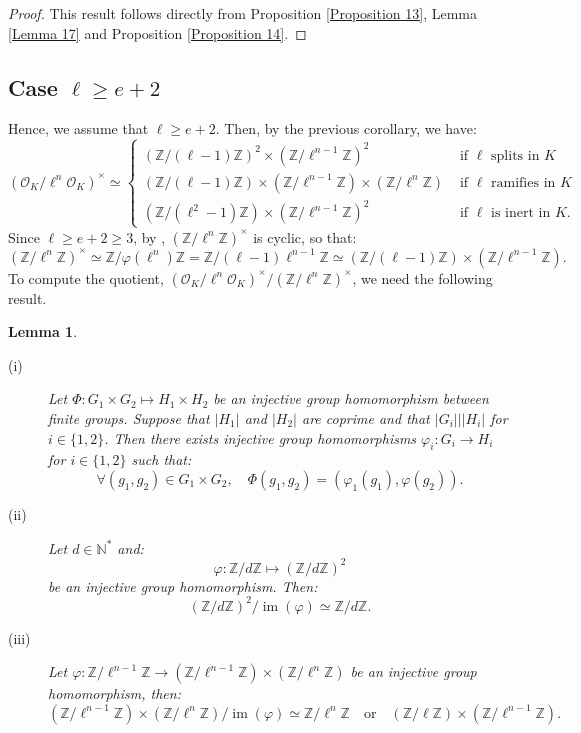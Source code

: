 \documentclass[a4paper,10pt]{report}
\theoremstyle{definition}
\theoremstyle{plain}
\newtheorem{Lemma}[Definition]{Lemma}
\theoremstyle{definition}
\newcommand{\N}{\mathbb{N}}
\newcommand{\Z}{\mathbb{Z}}
\newcommand{\mO}{\mathcal{O}}
\DeclareMathOperator{\im}{im}
\renewcommand{\(}{\left(}
\renewcommand{\)}{\right)}
\begin{document}
\begin{proof}
This result follows directly from Proposition \ref{Proposition 13}, Lemma \ref{Lemma 17} and Proposition \ref{Proposition 14}.
\end{proof}

\subsection{Case $\ell\geq e+2$}

Hence, we assume that $\ell\geq e+2$. Then, by the previous corollary, we have:
\[(\mO_K/\ell^n\mO_K)^\times\simeq \left\{ \begin{array}{ll} 
(\Z/(\ell-1)\Z)^2\times(\Z/\ell^{n-1}\Z)^2 & \mbox{ if $\ell$ splits in $K$}\\
(\Z/(\ell-1)\Z)\times(\Z/\ell^{n-1}\Z)\times(\Z/\ell^{n}\Z)  & \mbox{ if $\ell$ ramifies in $K$}\\ 
(\Z/(\ell^2-1)\Z)\times(\Z/\ell^{n-1}\Z)^2  & \mbox{ if $\ell$ is inert in $K$.}
\end{array}\right.\]
Since $\ell\geq e+2\geq 3$, by \cite[Theorem IV.2]{Ireland1982}, $(\Z/\ell^n\Z)^\times$ is cyclic, so that:
\[(\Z/\ell^n\Z)^\times\simeq \Z/\varphi(\ell^n)\Z=\Z/(\ell-1)\ell^{n-1}\Z\simeq (\Z/(\ell-1)\Z)\times(\Z/\ell^{n-1}\Z).\]
To compute the quotient, $(\mO_K/\ell^n\mO_K)^\times/(\Z/\ell^n\Z)^\times$, we need the following result.

\begin{Lemma}

\begin{description}

\item[(i)] Let $\Phi: G_1\times G_2\longmapsto H_1\times H_2$ be an injective group homomorphism between finite groups. Suppose that $|H_1|$ and $|H_2|$ are coprime and that $|G_i|||H_i|$ for $i\in\{1,2\}$. Then there exists injective group homomorphisms $\varphi_i: G_i\longrightarrow H_i$ for $i\in\{1,2\}$ such that:
\[\forall (g_1, g_2)\in G_1\times G_2, \quad \Phi(g_1,g_2)=(\varphi_1(g_1),\varphi(g_2)).\]

\item[(ii)] Let $d\in\N^*$ and:
\[\varphi: \Z/d\Z\longmapsto (\Z/d\Z)^2\]
be an injective group homomorphism. Then:
\[(\Z/d\Z)^2/\im(\varphi)\simeq \Z/d\Z.\]

\item[(iii)] Let $\varphi: \Z/\ell^{n-1}\Z\longrightarrow (\Z/\ell^{n-1}\Z)\times(\Z/\ell^{n}\Z)$ be an injective group homomorphism, then:
\[(\Z/\ell^{n-1}\Z)\times(\Z/\ell^{n}\Z)/\im(\varphi)\simeq \Z/\ell^{n}\Z \quad \mbox{or} \quad (\Z/\ell\Z)\times(\Z/\ell^{n-1}\Z).\]
\end{description}

\end{Lemma}
\end{document}
